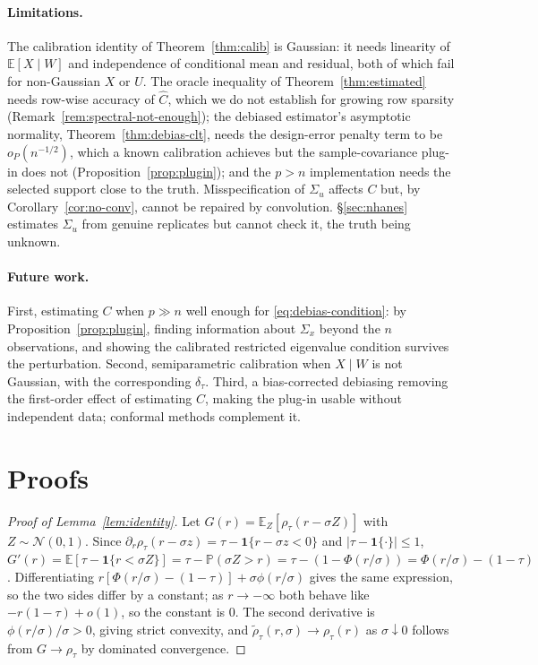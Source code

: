 \documentclass[12pt,a4paper]{article}
\theoremstyle{definition}
\theoremstyle{remark}
\newcommand{\E}{\mathbb{E}}
\newcommand{\Pbb}{\mathbb{P}}
\newcommand{\cN}{\mathcal{N}}
\newcommand{\ind}[1]{\mathbf{1}\{#1\}}
\newcommand{\rht}{\tilde{\rho}_\tau}
\newcommand{\Ccal}{C}
\begin{document}
\paragraph{Limitations.}
The calibration identity of Theorem~\ref{thm:calib} is Gaussian: it needs linearity of
$\E[X\mid W]$ and independence of conditional mean and residual, both of which fail for
non-Gaussian $X$ or $U$.
The oracle inequality of Theorem~\ref{thm:estimated} needs row-wise accuracy of
$\hat\Ccal$, which we do not establish for growing row sparsity
(Remark~\ref{rem:spectral-not-enough}); the debiased estimator's asymptotic normality,
Theorem~\ref{thm:debias-clt}, needs the design-error penalty term to be
$o_P(n^{-1/2})$, which a known calibration achieves but the sample-covariance plug-in does
not (Proposition~\ref{prop:plugin}); and the $p>n$ implementation needs the selected
support close to the truth. Misspecification of $\Sigma_u$ affects $\Ccal$ but, by
Corollary~\ref{cor:no-conv}, cannot be repaired by convolution. \S\ref{sec:nhanes}
estimates $\Sigma_u$ from genuine replicates but cannot check it, the truth being
unknown.

\paragraph{Future work.}
First, estimating $\Ccal$ when $p\gg n$ well enough for
\eqref{eq:debias-condition}: by Proposition~\ref{prop:plugin}, finding information about
$\Sigma_x$ beyond the $n$ observations, and showing the calibrated restricted eigenvalue
condition survives the perturbation. Second, semiparametric calibration when $X\mid W$ is
not Gaussian, with the corresponding $\delta_\tau$. Third, a bias-corrected debiasing
removing the first-order effect of estimating $\Ccal$, making the plug-in usable without
independent data; conformal methods \citep{romano2019conformalized} complement it.

\appendix
\section{Proofs}
\label{app:proofs}

\begin{proof}[Proof of Lemma~\ref{lem:identity}]
Let $G(r) = \E_Z[\rho_\tau(r-\sigma Z)]$ with $Z\sim\cN(0,1)$. Since
$\partial_r\rho_\tau(r-\sigma z) = \tau-\ind{r-\sigma z<0}$ and
$|\tau-\ind{\cdot}|\le1$,
$G'(r) = \E[\tau-\ind{r<\sigma Z}] = \tau-\Pbb(\sigma Z>r) = \tau-(1-\Phi(r/\sigma))
= \Phi(r/\sigma)-(1-\tau)$.
Differentiating $r[\Phi(r/\sigma)-(1-\tau)]+\sigma\phi(r/\sigma)$ gives the same
expression, so the two sides differ by a constant; as $r\to-\infty$ both behave like
$-r(1-\tau)+o(1)$, so the constant is $0$. The second derivative is
$\phi(r/\sigma)/\sigma>0$, giving strict convexity, and $\rht(r,\sigma)\to\rho_\tau(r)$ as
$\sigma\downarrow0$ follows from $G\to\rho_\tau$ by dominated convergence.
\end{proof}
\end{document}
